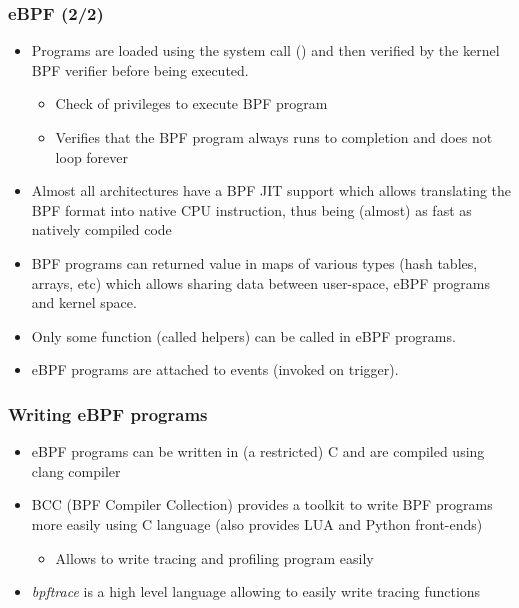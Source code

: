 \begin{frame}
  \frametitle{eBPF (2/2)}
  \begin{itemize}
    \item Programs are loaded using the  system call
          () and then verified by the kernel BPF verifier before
          being executed.
    \begin{itemize}
      \item Check of privileges to execute BPF program
      \item Verifies that the BPF program always runs to completion and does not
            loop forever
    \end{itemize}
    \item Almost all architectures have a BPF JIT support which allows
          translating the BPF format into native CPU instruction, thus being
          (almost) as fast as natively compiled code
    \item BPF programs can returned value in maps of various types (hash tables,
          arrays, etc) which allows sharing data between user-space, eBPF
          programs and kernel space.
    \item Only some function (called helpers) can be called in eBPF programs.
    \item eBPF programs are attached to events (invoked on trigger).
  \end{itemize}
\end{frame}

\begin{frame}[fragile]
  \frametitle{Writing eBPF programs}
  \begin{itemize}
    \item eBPF programs can be written in (a restricted) C and are compiled
          using clang compiler
    \item BCC (BPF Compiler Collection) provides a toolkit to write BPF
          programs more easily using C language (also provides LUA and Python
          front-ends)
    \begin{itemize}
      \item Allows to write tracing and profiling program easily
    \end{itemize}
    \item {\em bpftrace} is a high level language allowing to easily write tracing
          functions
  \end{itemize}
\end{frame}


